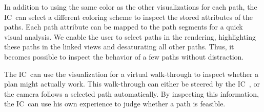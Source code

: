 \documentclass{egpubl}
\def\IC{IC}
\begin{document}
In addition to using the same color as the other visualizations for each path, the \IC\ can select a different coloring scheme to inspect the stored attributes of the paths. Each path attribute can be mapped to the path segments for a quick visual analysis. We enable the user to select paths in the rendering, highlighting these paths in the linked views and desaturating all other paths. Thus, it becomes possible to inspect the behavior of a few paths without distraction.

The \IC\ can use the visualization for a virtual walk-through to inspect whether a plan might actually work. This walk-through can either be steered by the \IC\ , or the camera follows a selected path automatically. By inspecting this information, the \IC\ can use his own experience to judge whether a path is feasible.

\end{document}
